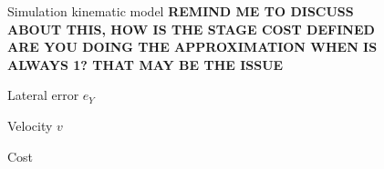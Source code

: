 \begin{figure}[ht]
	\centering
  	
	\caption{Simulation kinematic model {\bfseries{REMIND ME TO DISCUSS ABOUT THIS, HOW IS THE STAGE COST DEFINED ARE YOU DOING THE APPROXIMATION WHEN IS ALWAYS 1? THAT MAY BE THE ISSUE}}}
	\label{fig:SimKin_xy}
\end{figure}

\begin{figure}[ht]
	\centering
  	
  	\caption{Lateral error $e_Y$}
	\label{fig:SimKin_eY}
\end{figure}

\begin{figure}[ht]
	\centering
  	
  	\caption{Velocity $v$}
	\label{fig:SimKin_v}
\end{figure}

\begin{figure}[ht]
	\centering
  	
  	\caption{Cost}
	\label{fig:SimKin_cost}
\end{figure}
